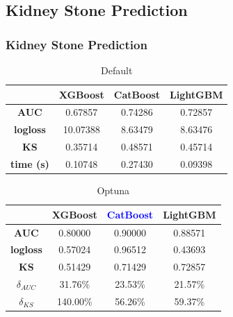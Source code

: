 \documentclass{beamer}
\begin{document}
\subsection{Kidney Stone Prediction}
\begin{frame}
\frametitle{Kidney Stone Prediction}
\begin{table}[H]
\centering
\begin{tabular}{|c|c|c|c|}
\hline
	& \textbf{XGBoost} &\textbf{CatBoost} & \textbf{LightGBM} \\
\hline
\textbf{AUC}	& 0.67857	&0.74286	&0.72857\\
\hline
\textbf{logloss}	& 10.07388	&8.63479	&8.63476\\
\hline
\textbf{KS}	&0.35714&	0.48571&	0.45714\\
\hline
\textbf{time (s)}	&0.10748	&0.27430	&0.09398 \\
\hline
\end{tabular}
\caption{Default}\label{res:dia:1}
\end{table}
\begin{table}[H]
\centering
\begin{tabular}{|c|c|c|c|}
\hline
	& \textbf{XGBoost} & \textcolor{blue}{\textbf{CatBoost}} & \textbf{LightGBM} \\
\hline
\textbf{AUC}	& 0.80000	&0.90000&	0.88571 \\
\hline
\textbf{logloss}	& 0.57024	& 0.96512 &	0.43693\\
\hline
\textbf{KS}	&0.51429&	0.71429	& 0.72857\\
\hline
$\delta_{AUC}$	& 31.76\%&	23.53\%	   &     21.57\% \\
\hline
$\delta_{KS}$	& 140.00\%     	&  56.26\% &	59.37\%\\
\hline
\end{tabular}
\caption{Optuna}\label{res:dia:op}
\end{table}
\end{frame}


\end{document}
